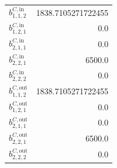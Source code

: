 \documentclass{article}%
\begin{document}
\begin{multicols*}{3}
\begin{supertabular}{lr}
	$b_{1,1,2}^{C,\text{in}}$ & 1838.7105271722455 \\%
	$b_{1,2,1}^{C,\text{in}}$ & 0.0 \\%
	$b_{2,1,1}^{C,\text{in}}$ & 0.0 \\%
	$b_{2,2,1}^{C,\text{in}}$ & 6500.0 \\%
	$b_{2,2,2}^{C,\text{in}}$ & 0.0 \\%
	$b_{1,1,2}^{C,\text{out}}$ & 1838.7105271722455 \\%
	$b_{1,2,1}^{C,\text{out}}$ & 0.0 \\%
	$b_{2,1,1}^{C,\text{out}}$ & 0.0 \\%
	$b_{2,2,1}^{C,\text{out}}$ & 6500.0 \\%
	$b_{2,2,2}^{C,\text{out}}$ & 0.0 \\%
\end{supertabular}%
\end{multicols*}%
\end{document}
